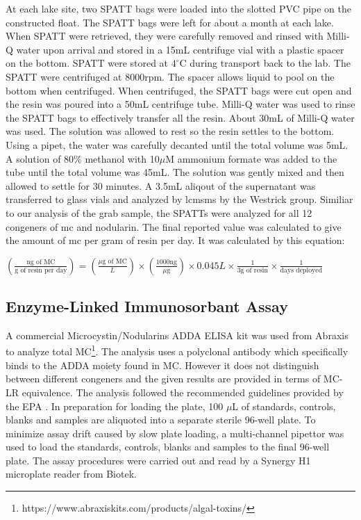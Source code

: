 At each lake site, two SPATT bags were loaded into the slotted PVC pipe on the constructed float. The SPATT bags were left for about a month at each lake. When SPATT were retrieved, they were carefully removed and rinsed with Milli-Q water upon arrival and stored in a 15mL centrifuge vial with a plastic spacer on the bottom. SPATT were stored at $4^\circ$C during transport back to the lab. The SPATT were centrifuged at 8000rpm. The spacer allows liquid to pool on the bottom when centrifuged. When centrifuged, the SPATT bags were cut open and the resin was poured into a 50mL centrifuge tube. Milli-Q water was used to rinse the SPATT bags to effectively transfer all the resin. About 30mL of Milli-Q water was used. The solution was allowed to rest so the resin settles to the bottom. Using a pipet, the water was carefully decanted until the total volume was 5mL.  A solution of 80\% methanol with 10$\mu$M ammonium formate was added to the tube until the total volume was 45mL. The solution was gently mixed and then allowed to settle for 30 minutes. A 3.5mL aliqout of the supernatant was transferred to glass vials and analyzed by \gls{lcmsms} by the Westrick group. Similiar to our analysis of the grab sample, the SPATTs were analyzed for all 12 congeners of \gls{mc} and nodularin. The final reported value was calculated to give the amount of \gls{mc} per gram of resin per day. It was calculated by this equation:

\begin {center} 
$(\frac{\text{ng of MC}}{\text{g of resin per day}}) =(\frac{\text{$\mu$g of MC}}{L}) \times (\frac{\text{1000ng}}{\text{$\mu$g}}) \times {0.045L} \times \frac{1}{\text{3g of resin}} \times \frac{1}{\text{days deployed}}$
\end{center}



\subsection{Enzyme-Linked Immunosorbant Assay}

A commercial Microcystin/Nodularins ADDA ELISA kit was used from Abraxis to analyze total MC\footnote{https://www.abraxiskits.com/products/algal-toxins/}. The analysis uses a polyclonal antibody which specifically binds to the ADDA moiety found in MC. However it does not distinguish between different congeners and the given results are provided in terms of MC-LR equivalence. The analysis followed the recommended guidelines provided by the EPA \cite{usepa_method_2016}. In preparation for loading the plate,  100 $\mu$L of standards, controls, blanks and samples are aliquoted into a separate sterile 96-well plate. To minimize assay drift caused by slow plate loading, a multi-channel pipettor was used to load the standards, controls, blanks and samples to the final 96-well plate. The assay procedures were carried out and read by a Synergy H1 microplate reader from Biotek.


